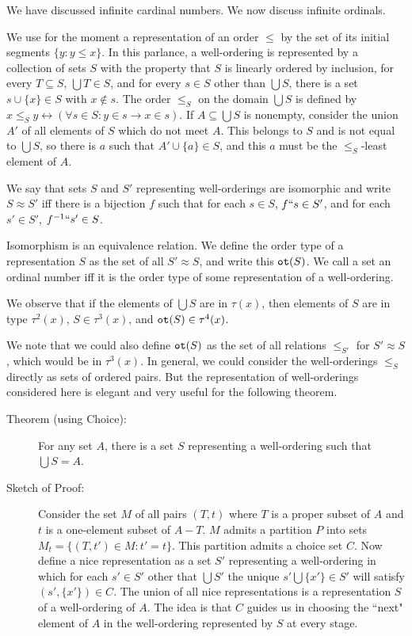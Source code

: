 \documentclass[12pt]{article}
\begin{document}
We have discussed infinite cardinal numbers.  We now discuss infinite ordinals. 

We use for the moment a representation of an order $\leq$ by the set of its initial segments $\{y:y \leq x\}$.  In this parlance, a well-ordering is represented by a collection of sets $S$ with the property that $S$ is linearly ordered by inclusion, for every $T \subseteq S$, $\bigcup T \in S$, and for every $s \in S$ other than $\bigcup S$, there is a set $s \cup \{x\} \in S$ with $x \not\in s$.  The order $\leq_S$ on the domain $\bigcup S$ is defined by $x \leq_S y \leftrightarrow (\forall s \in S:y \in s \rightarrow x \in s)$.  If $A \subseteq \bigcup S$ is nonempty, consider the union $A'$ of all elements of $S$ which do not meet $A$.  This belongs to $S$ and is not equal to $\bigcup S$, so there is $a$ such that $A' \cup \{a\} \in S$, and this $a$ must be the $\leq_S$-least element of $A$.

We say that sets $S$ and $S'$ representing well-orderings are isomorphic and write $S \approx S'$ iff there is a bijection $f$ such that for each $s \in S$, $f``s \in S'$, and for each $s' \in S'$, $f^{-1}``s' \in S$.

Isomorphism is an equivalence relation.  We define the order type of a representation $S$ as the set of all $S' \approx S$, and write this ${\tt ot}(S)$.  We call a set an ordinal number iff it is the order type of some representation of a well-ordering.  

We observe that if the elements of $\bigcup S$ are in $\tau(x)$, then elements of $S$ are in type $\tau^2(x)$, $S \in \tau^3(x)$, and ${\tt ot}(S) \in \tau^4(x)$.

We note that we could also define ${\tt ot}(S)$ as the set of all relations $\leq_{S'}$ for $S' \approx S$, which would be in $\tau^3(x)$.  In general, we could consider the
well-orderings $\leq_S$ directly as sets of ordered pairs.  But the representation of well-orderings considered here is elegant and very useful for the following theorem.

\begin{description}

\item[Theorem (using Choice):]  For any set $A$, there is a set $S$ representing a well-ordering such that $\bigcup S=A$.

\item[Sketch of Proof:]  Consider the set $M$ of all pairs $(T,t)$ where $T$ is a proper subset of $A$ and $t$ is a one-element subset of $A-T$.  $M$ admits a partition $P$ into sets $M_t = \{(T,t') \in M:t' = t\}$.  This partition admits a choice set $C$.  Now define a nice representation
as a set $S'$ representing a well-ordering in which for each $s' \in S'$ other that $\bigcup S'$ the unique $s' \bigcup \{x'\} \in S'$ will satisfy $(s',\{x'\}) \in C$.  The union of all nice representations is a representation $S$ of a well-ordering of $A$.  The idea is that $C$ guides us in choosing the ``next" element of $A$ in the well-ordering represented by $S$ at every stage.

\end{description}
\end{document}
